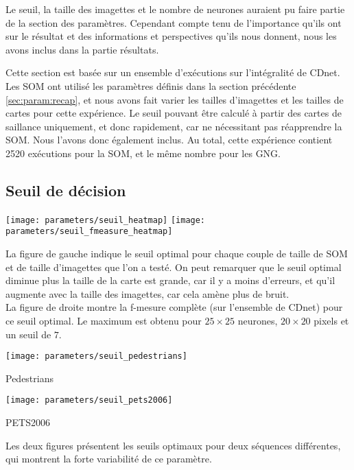 	Le seuil, la taille des imagettes et le nombre de neurones auraient pu faire partie de la section des paramètres. Cependant compte tenu de l'importance qu'ils ont sur le résultat et des informations et perspectives qu'ils nous donnent, nous les avons inclus dans la partie résultats.

	Cette section est basée sur un ensemble d'exécutions sur l'intégralité de CDnet. Les SOM ont utilisé les paramètres définis dans la section précédente \ref{sec:param:recap}, et nous avons fait varier les tailles d'imagettes et les tailles de cartes pour cette expérience. Le seuil pouvant être calculé à partir des cartes de saillance uniquement, et donc rapidement, car ne nécessitant pas réapprendre la SOM. Nous l'avons donc également inclus. Au total, cette expérience contient 2520 exécutions pour la SOM, et le même nombre pour les GNG. 

	\subsection{Seuil de décision}

	\begin{figureth}
		\texttt{[image: parameters/seuil\_heatmap]}
		\texttt{[image: parameters/seuil\_fmeasure\_heatmap]}
		\caption[Seuil de décision]{La figure de gauche indique le seuil optimal pour chaque couple de taille de SOM et de taille d'imagettes que l'on a testé. On peut remarquer que le seuil optimal diminue plus la taille de la carte est grande, car il y a moins d'erreurs, et qu'il augmente avec la taille des imagettes, car cela amène plus de bruit.\\

		La figure de droite montre la f-mesure complète (sur l'ensemble de CDnet) pour ce seuil optimal. Le maximum est obtenu pour $25\times25$ neurones, $20\times20$ pixels et un seuil de $7$.}\label{fig:res:seuil}

	\end{figureth}
		\begin{figureth}
		\begin{subfigureth}{.48\textwidth}
			\texttt{[image: parameters/seuil\_pedestrians]}\caption{Pedestrians}
		\end{subfigureth}
		\begin{subfigureth}{.48\textwidth}
			\texttt{[image: parameters/seuil\_pets2006]}\caption{PETS2006}
		\end{subfigureth}
		\caption[Seuil de décision en fonction de la séquence]{Les deux figures présentent les seuils optimaux pour deux séquences différentes, qui montrent la forte variabilité de ce paramètre.}\label{fig:res:seuil_seq}
	\end{figureth}

